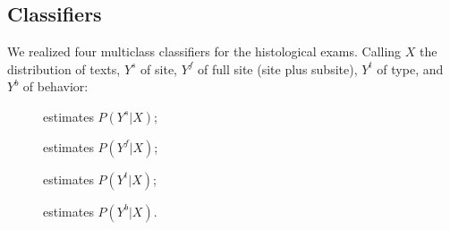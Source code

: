 




\subsection{Classifiers}
We realized four multiclass classifiers for the
histological exams. Calling $X$ the distribution of texts, $Y^s$
of site, $Y^f$ of full site (site plus subsite), $Y^t$ of type, and
$Y^b$ of behavior:
\begin{description}
  \item[\site{}] estimates $P(Y^s|X)$;
  \item[\fullSite{}] estimates $P(Y^f|X)$;
  \item[\type{}] estimates $P(Y^t|X)$;
  \item[\behaviour{}] estimates $P(Y^b|X)$.
\end{description}


